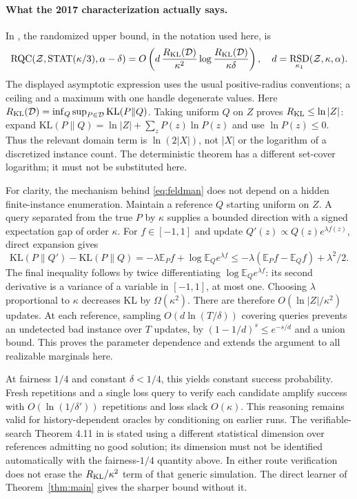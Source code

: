 \documentclass[11pt]{article}
\DeclareMathOperator{\RSD}{RSD}
\newcommand{\E}{\mathbb E}
\newcommand{\1}{\mathbf 1}
\begin{document}
\paragraph{What the 2017 characterization actually says.}
In \citet[Theorem 4.8]{Feldman17}, the randomized upper bound, in the notation used here, is
\begin{equation}\label{eq:feldman}
 \operatorname{RQC}(\mathcal Z,\operatorname{STAT}(\kappa/3),\alpha-\delta)
 =O\left(d\,\frac{R_{\rm KL}(\mathcal D)}{\kappa^2}
       \log\frac{R_{\rm KL}(\mathcal D)}{\kappa\delta}\right),
 \quad d=\RSD_{\kappa_1}(\mathcal Z,\kappa,\alpha).
\end{equation}
The displayed asymptotic expression uses the usual positive-radius conventions; a ceiling and a maximum with one handle degenerate values. Here $R_{\rm KL}(\mathcal D)=\inf_Q\sup_{P\in\mathcal D}\mathrm{KL}(P\|Q)$. Taking uniform $Q$ on $Z$ proves $R_{\rm KL}\le\ln|Z|$: expand $\mathrm{KL}(P\|Q)=\ln|Z|+\sum_zP(z)\ln P(z)$ and use $\ln P(z)\le0$. Thus the relevant domain term is $\ln(2|X|)$, not $|X|$ or the logarithm of a discretized instance count. The deterministic theorem has a different set-cover logarithm; it must not be substituted here.

For clarity, the mechanism behind \eqref{eq:feldman} does not depend on a hidden finite-instance enumeration. Maintain a reference $Q$ starting uniform on $Z$. A query separated from the true $P$ by $\kappa$ supplies a bounded direction with a signed expectation gap of order $\kappa$. For $f\in[-1,1]$ and update $Q'(z)\propto Q(z)e^{\lambda f(z)}$, direct expansion gives
\[
 \mathrm{KL}(P\|Q')-\mathrm{KL}(P\|Q)
 =-\lambda\E_Pf+\log\E_Qe^{\lambda f}
 \le-\lambda(\E_Pf-\E_Qf)+\lambda^2/2.
\]
The final inequality follows by twice differentiating $\log\E_Qe^{\lambda f}$: its second derivative is a variance of a variable in $[-1,1]$, at most one. Choosing $\lambda$ proportional to $\kappa$ decreases KL by $\Omega(\kappa^2)$. There are therefore $O(\ln|Z|/\kappa^2)$ updates. At each reference, sampling $O(d\ln(T/\delta))$ covering queries prevents an undetected bad instance over $T$ updates, by $(1-1/d)^s\le e^{-s/d}$ and a union bound. This proves the parameter dependence and extends the argument to all realizable marginals here.

At fairness $1/4$ and constant $\delta<1/4$, this yields constant success probability. Fresh repetitions and a single loss query to verify each candidate amplify success with $O(\ln(1/\delta'))$ repetitions and loss slack $O(\kappa)$. This reasoning remains valid for history-dependent oracles by conditioning on earlier runs. The verifiable-search Theorem 4.11 in \citet{Feldman17} is stated using a different statistical dimension over references admitting no good solution; its dimension must not be identified automatically with the fairness-$1/4$ quantity above. In either route verification does not erase the $R_{\rm KL}/\kappa^2$ term of that generic simulation. The direct learner of Theorem~\ref{thm:main} gives the sharper bound without it.
\end{document}
